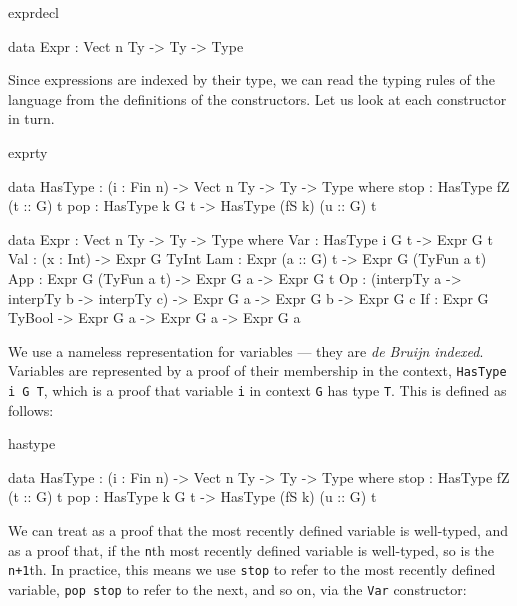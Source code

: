 \begin{SaveVerbatim}{exprdecl}

data Expr : Vect n Ty -> Ty -> Type

\end{SaveVerbatim}

\noindent
Since expressions are indexed by their type, we can read the typing rules of
the language from the definitions of the constructors. Let us look at each
constructor in turn.

\begin{SaveVerbatim}{exprty}

data HasType : (i : Fin n) -> Vect n Ty -> Ty -> Type where
    stop : HasType fZ (t :: G) t
    pop  : HasType k G t -> HasType (fS k) (u :: G) t

data Expr : Vect n Ty -> Ty -> Type where
    Var : HasType i G t -> Expr G t
    Val : (x : Int) -> Expr G TyInt
    Lam : Expr (a :: G) t -> Expr G (TyFun a t)
    App : Expr G (TyFun a t) -> Expr G a -> Expr G t
    Op  : (interpTy a -> interpTy b -> interpTy c) -> Expr G a -> Expr G b -> 
          Expr G c
    If  : Expr G TyBool -> Expr G a -> Expr G a -> Expr G a
  
\end{SaveVerbatim}

\noindent
We use a nameless representation for variables --- they are \emph{de Bruijn indexed}.
Variables are represented by a proof of their membership in the context, 
\texttt{HasType i G T}, which is a proof that variable \texttt{i} in context 
\texttt{G} has type \texttt{T}. This is defined as follows:

\begin{SaveVerbatim}{hastype}

data HasType : (i : Fin n) -> Vect n Ty -> Ty -> Type where
    stop : HasType fZ (t :: G) t
    pop  : HasType k G t -> HasType (fS k) (u :: G) t

\end{SaveVerbatim}

\noindent
We can treat  as a proof that the most recently defined variable is well-typed,
and  as a proof that, if the \texttt{n}th most recently defined variable is
well-typed, so is the \texttt{n+1}th. In practice, this means we use \texttt{stop} to
refer to the most recently defined variable, \texttt{pop stop} to refer to the next, and so on,
via the \texttt{Var} constructor:

